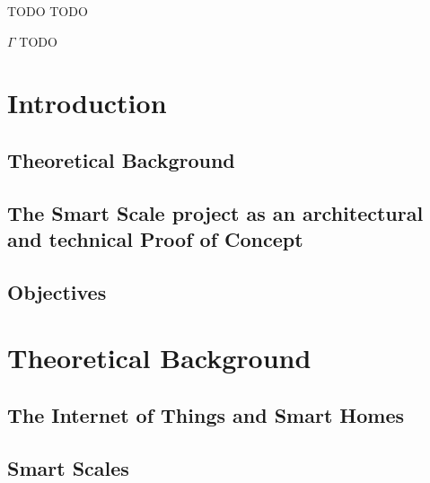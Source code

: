 \documentclass[
12pt,        %
openright,   %
twoside,     %
a4paper,     %
brazil,       %
english       %
%
%
]{ppgca}
\begin{document}

\listoftables*
\cleardoublepage

\begin{siglas}
  \item[TODO] TODO
\end{siglas}

\begin{simbolos}
  \item[$ \Gamma $] TODO
\end{simbolos}

\tableofcontents*
\cleardoublepage
\textual

\chapter{Introduction} %
\section{Theoretical Background}
\section{The Smart Scale project as an architectural and technical Proof of Concept}
\section{Objectives}


\chapter{Theoretical Background}
\section{The Internet of Things and Smart Homes}
\section{Smart Scales}
\end{document}
